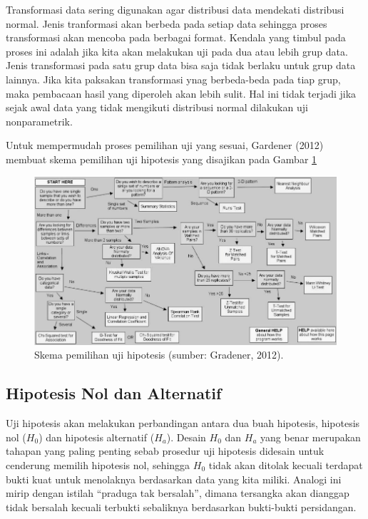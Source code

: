 \documentclass[]{book}
\begin{document}
Transformasi data sering digunakan agar distribusi data mendekati
distribusi normal. Jenis tranformasi akan berbeda pada setiap data
sehingga proses transformasi akan mencoba pada berbagai format. Kendala
yang timbul pada proses ini adalah jika kita akan melakukan uji pada dua
atau lebih grup data. Jenis transformasi pada satu grup data bisa saja
tidak berlaku untuk grup data lainnya. Jika kita paksakan transformasi
ynag berbeda-beda pada tiap grup, maka pembacaan hasil yang diperoleh
akan lebih sulit. Hal ini tidak terjadi jika sejak awal data yang tidak
mengikuti distribusi normal dilakukan uji nonparametrik.

Untuk mempermudah proses pemilihan uji yang sesuai, Gardener (2012)
membuat skema pemilihan uji hipotesis yang disajikan pada Gambar
\ref{fig:test}

\newpage

\begin{landscape}
\begin{figure}

{\centering \includegraphics[width=11.99in]{test} 

}

\caption{Skema pemilihan uji hipotesis (sumber: Gradener, 2012).}\label{fig:test}
\end{figure}
\end{landscape}

\subsection{Hipotesis Nol dan
Alternatif}\label{hipotesis-nol-dan-alternatif}

Uji hipotesis akan melakukan perbandingan antara dua buah hipotesis,
hipotesis nol (\(H_0\)) dan hipotesis alternatif (\(H_a\)). Desain
\(H_0\) dan \(H_a\) yang benar merupakan tahapan yang paling penting
sebab prosedur uji hipotesis didesain untuk cenderung memilih hipotesis
nol, sehingga \(H_0\) tidak akan ditolak kecuali terdapat bukti kuat
untuk menolaknya berdasarkan data yang kita miliki. Analogi ini mirip
dengan istilah ``praduga tak bersalah'', dimana tersangka akan dianggap
tidak bersalah kecuali terbukti sebaliknya berdasarkan bukti-bukti
persidangan.
\end{document}
